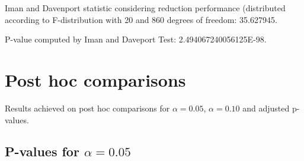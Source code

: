 \documentclass[a4paper,10pt]{article}
\begin{document}
\begin{landscape}
Iman and Davenport statistic considering reduction performance (distributed according to F-distribution with 20 and 860 degrees of freedom: 35.627945.

P-value computed by Iman and Daveport Test: 2.494067240056125E-98.\newline



\pagebreak

\section{Post hoc comparisons}

Results achieved on post hoc comparisons for $\alpha = 0.05$, $\alpha = 0.10$ and adjusted p-values.

\subsection{P-values for $\alpha=0.05$}


\end{landscape}
\end{document}
